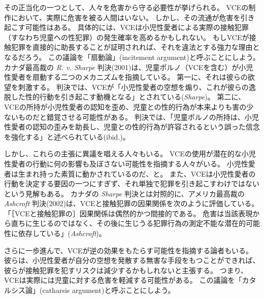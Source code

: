 \documentclass[paper=a4,book,openany]{jlreq}
\begin{document}
その正当化の一つとして、人々を危害から守る必要性が挙げられる。
VCEの制作において、実際に危害を被る人間はいない。
しかし、その流通が危害を引き起こす可能性はある。
具体的には、VCEは小児性愛者による実際の接触犯罪（すなわち児童への性犯罪）の発生確率を高めるかもしれない。
もしVCEが接触犯罪を直接的に助長することが証明されれば、それを違法とする強力な理由となるだろう。
この議論を「扇動論」(incitement argument)と呼ぶことにしよう。
カナダ最高裁の \emph{R. v. Sharpe} 判決(2001)は、児童ポルノ（VCEを含む）が小児性愛者を扇動する二つのメカニズムを指摘している。
第一に、それは彼らの欲望を刺激する。
判決では、VCEが「小児性愛者の空想を煽り、これが彼らの逸脱した性的行動を引き起こす動機となる」とされている(\emph{Sharpe})。
第二に、VCEの所持が小児性愛者の認知を歪め、児童との性的行為が本来よりも害の少ないものだと錯覚させる可能性がある。
判決では、「児童ポルノの所持は、小児性愛者の認知の歪みを助長し、児童との性的行為が許容されるという誤った信念を強化する」と述べられている(ibid.)。

しかし、これらの主張に異議を唱える人々もいる。
VCEの使用が潜在的な小児性愛者の行動に何の影響も及ぼさない可能性を指摘する人々がいる。
小児性愛者は生まれ持った素質に動かされているのだ、と。
また、VCEは小児性愛者の行動を決定する要因の一つにすぎず、それ単独で犯罪を引き起こすわけではないという見解もある。
カナダの \emph{Sharpe} 判決とは対照的に、アメリカ最高裁の \emph{Ashcroft} 判決(2002)は、VCEと接触犯罪の因果関係を次のように評価している。
「［VCEと接触犯罪の］因果関係は偶然的かつ間接的である。
危害は当該表現から直ちに生じるのではなく、その後に生じうる犯罪行為の測定不能な潜在的可能性に依存している」(\emph{Ashcroft})。

さらに一歩進んで、VCEが逆の効果をもたらす可能性を指摘する論者もいる。
彼らは、小児性愛者が自分の空想を発散する無害な手段をもつことができれば、彼らが接触犯罪を犯すリスクは減少するかもしれないと主張する。
つまり、VCEは実際には児童に対する危害を軽減する可能性がある。
この議論を「カタルシス論」(catharsis argument)と呼ぶことにしよう。
\end{document}
